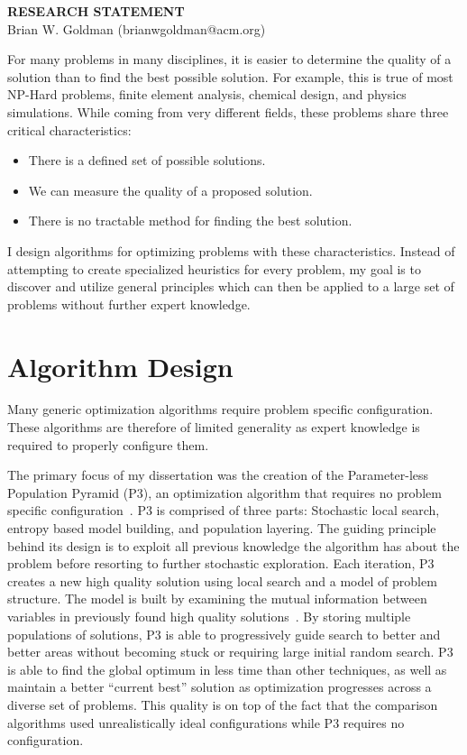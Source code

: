 \documentclass[a4paper, 11pt]{article}
\begin{document}
\thispagestyle{empty}

\pagestyle{fancy}

\begin{center}
{\LARGE \bf RESEARCH STATEMENT}\\
\vspace*{0.1cm}
{\normalsize Brian W. Goldman (brianwgoldman@acm.org)}
\end{center}

\noindent
For many problems in many disciplines, it is easier to determine the quality of a solution
than to find the best possible solution. For example, this is true of most NP-Hard problems,
finite element analysis, chemical design, and physics simulations.
While coming from very different fields, these problems share
three critical characteristics:
\begin{itemize}
\item There is a defined set of possible solutions.
\item We can measure the quality of a proposed solution.
\item There is no tractable method for finding the best solution.
\end{itemize}
I design algorithms for optimizing problems with these characteristics. Instead of
attempting to create specialized heuristics for every problem,
my goal is to discover and utilize general principles which can
then be applied to a large set of problems without further expert knowledge.

\section{Algorithm Design}
Many generic optimization algorithms require problem specific
configuration. These algorithms are therefore of limited generality
as expert knowledge is required to properly configure them.

The primary focus of my dissertation was the creation of the
Parameter-less Population Pyramid (P3), an optimization algorithm
that requires no problem specific configuration~\cite{goldman:2014:p3,goldman:2015:fastp3}.
P3 is comprised of three parts: Stochastic local search, entropy based model building, and
population layering. The guiding principle behind its design is to exploit all previous
knowledge the algorithm has about the problem before resorting to further stochastic exploration.
Each iteration, P3 creates a new high quality solution using local search and a model of
problem structure. The model is built by examining the mutual information between variables
in previously found high quality solutions~\cite{goldman:2012:ltga}.
By storing multiple populations of solutions, P3 is able to progressively guide search
to better and better areas without becoming stuck or requiring large initial random search.
P3 is able to find the global optimum in less time than other techniques, as well as
maintain a better ``current best'' solution as optimization progresses across a diverse set of problems.
This quality is on top
of the fact that the comparison algorithms used unrealistically ideal configurations while
P3 requires no configuration.
\end{document}
